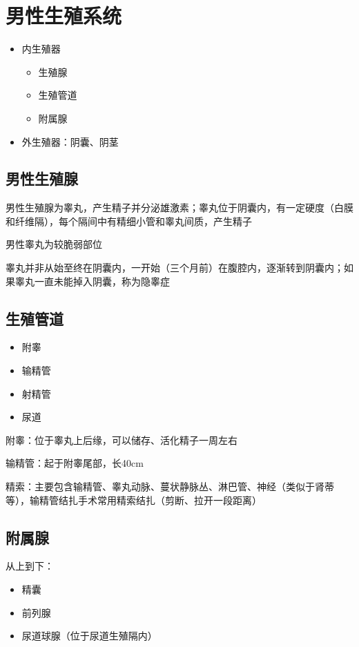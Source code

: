 \section{男性生殖系统}%
\label{sec:男性生殖系统}
\begin{itemize}
    \item 内生殖器
        \begin{itemize}
            \item 生殖腺
            \item 生殖管道
            \item 附属腺
        \end{itemize}
    \item 外生殖器：阴囊、阴茎
\end{itemize}
\subsection{男性生殖腺}%
\label{sub:男性生殖腺}
男性生殖腺为睾丸，产生精子并分泌雄激素；睾丸位于阴囊内，有一定硬度（白膜和纤维隔），每个隔间中有精细小管和睾丸间质，产生精子
\begin{notation}
    男性睾丸为较脆弱部位
\end{notation}
\begin{notation}
    睾丸并非从始至终在阴囊内，一开始（三个月前）在腹腔内，逐渐转到阴囊内；如果睾丸一直未能掉入阴囊，称为隐睾症
\end{notation}
\subsection{生殖管道}%
\label{sub:生殖管道}
\begin{itemize}
    \item 附睾
    \item 输精管
    \item 射精管
    \item 尿道
\end{itemize}
\begin{notation}
    附睾：位于睾丸上后缘，可以储存、活化精子一周左右
\end{notation}
输精管：起于附睾尾部，长40cm
\begin{notation}
    精索：主要包含输精管、睾丸动脉、蔓状静脉丛、淋巴管、神经（类似于肾蒂等），输精管结扎手术常用精索结扎（剪断、拉开一段距离）
\end{notation}
\subsection{附属腺}%
\label{sub:附属腺}
从上到下：
\begin{itemize}
    \item 精囊
    \item 前列腺
    \item 尿道球腺（位于尿道生殖隔内）
\end{itemize}
